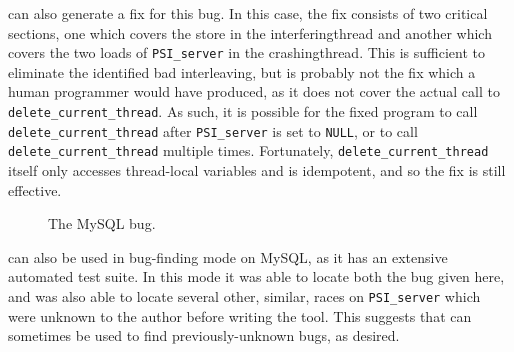 
{\Technique} can also generate a fix for this bug.  In this case, the
fix consists of two critical sections, one which covers the store in
the \gls{interferingthread} and another which covers the two loads of
\texttt{PSI\_server} in the \gls{crashingthread}.  This is sufficient
to eliminate the identified bad interleaving, but is probably not the
fix which a human programmer would have produced, as it does not cover
the actual call to \texttt{delete\_current\_thread}.  As such, it is
possible for the fixed program to call
\texttt{delete\_current\_thread} after \texttt{PSI\_server} is set to
\texttt{NULL}, or to call \texttt{delete\_current\_thread} multiple
times.  Fortunately, \texttt{delete\_current\_thread} itself only
accesses thread-local variables and is idempotent, and so the fix is
still effective.

\begin{figure}
  \vspace{-6pt}
  \caption{The MySQL bug.}
  \label{fig:eval:mysqld}
\end{figure}

{\Implementation} can also be used in bug-finding mode on MySQL, as it
has an extensive automated test suite.  In this mode it was able to
locate both the bug given here, and was also able to locate several
other, similar, races on \texttt{PSI\_server} which were unknown to
the author before writing the tool.  This suggests that
{\implementation} can sometimes be used to find previously-unknown
bugs, as desired.



